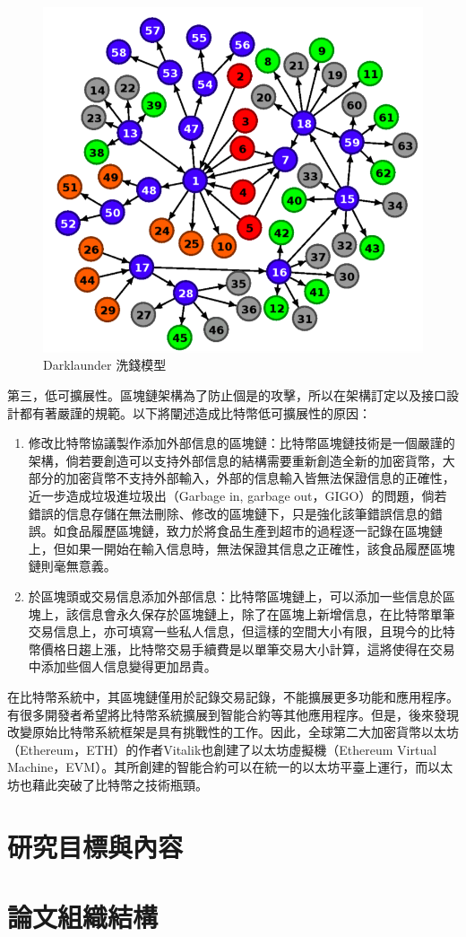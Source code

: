 					\begin{figure}[htbp]
						\centering
						\includegraphics[width = .7\textwidth]{Darklaunderworkflow.png}
						\caption{Darklaunder 洗錢模型\supercite{AnAnalysisofBitcoinLaundryServices}}\label{Darklaunderworkflow}
					\end{figure}

				第三，低可擴展性。區塊鏈架構為了防止個是的攻擊，所以在架構訂定以及接口設計都有著嚴謹的規範。以下將闡述造成比特幣低可擴展性的原因：

					\begin{enumerate}

						\item 修改比特幣協議製作添加外部信息的區塊鏈：比特幣區塊鏈技術是一個嚴謹的架構，倘若要創造可以支持外部信息的結構需要重新創造全新的加密貨幣，大部分的加密貨幣不支持外部輸入，外部的信息輸入皆無法保證信息的正確性，近一步造成垃圾進垃圾出（Garbage in, garbage out，GIGO）的問題，倘若錯誤的信息存儲在無法刪除、修改的區塊鏈下，只是強化該筆錯誤信息的錯誤。如食品履歷區塊鏈，致力於將食品生產到超市的過程逐一記錄在區塊鏈上，但如果一開始在輸入信息時，無法保證其信息之正確性，該食品履歷區塊鏈則毫無意義。

						\item 於區塊頭或交易信息添加外部信息：比特幣區塊鏈上，可以添加一些信息於區塊上，該信息會永久保存於區塊鏈上，除了在區塊上新增信息，在比特幣單筆交易信息上，亦可填寫一些私人信息，但這樣的空間大小有限，且現今的比特幣價格日趨上漲，比特幣交易手續費是以單筆交易大小計算，這將使得在交易中添加些個人信息變得更加昂貴。

					\end{enumerate}

				在比特幣系統中，其區塊鏈僅用於記錄交易記錄，不能擴展更多功能和應用程序。有很多開發者希望將比特幣系統擴展到智能合約等其他應用程序。但是，後來發現改變原始比特幣系統框架是具有挑戰性的工作。因此，全球第二大加密貨幣以太坊（Ethereum，ETH）的作者Vitalik也創建了以太坊虛擬機（Ethereum Virtual Machine，EVM）。其所創建的智能合約可以在統一的以太坊平臺上運行，而以太坊也藉此突破了比特幣之技術瓶頸。

	\section{研究目標與內容}
	\section{論文組織結構}
